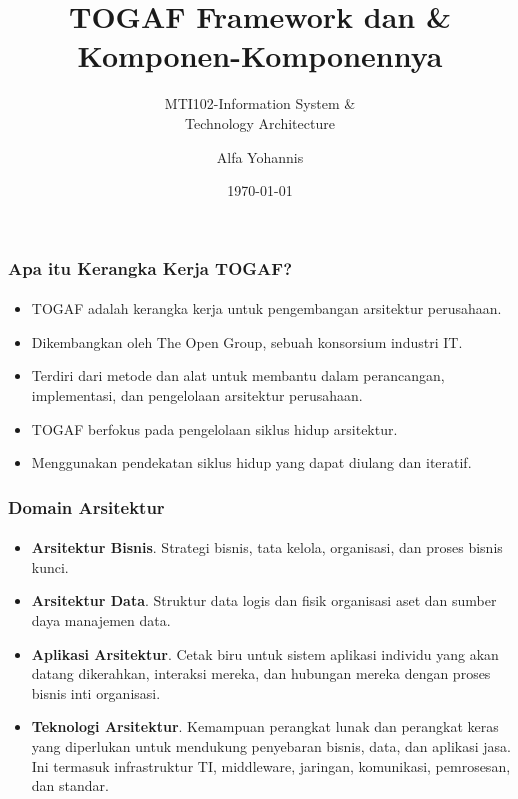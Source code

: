 \documentclass[aspectratio=169, table]{beamer}
\subtitle{MTI102-Information System \&\\Technology Architecture}
\title{TOGAF Framework dan \&\\ Komponen-Komponennya}
\author{Alfa Yohannis}
\date{\today}
\begin{document}
	
	\frame{\titlepage}
	
	\begin{frame}
		\frametitle{Apa itu Kerangka Kerja TOGAF?}
		\framesubtitle{\hspace{1cm}}
		\begin{itemize}
			\item TOGAF adalah kerangka kerja untuk pengembangan arsitektur perusahaan.
			\item Dikembangkan oleh The Open Group, sebuah konsorsium industri IT.
			\item Terdiri dari metode dan alat untuk membantu dalam perancangan, implementasi, dan pengelolaan arsitektur perusahaan.
			\item TOGAF berfokus pada pengelolaan siklus hidup arsitektur.
			\item Menggunakan pendekatan siklus hidup yang dapat diulang dan iteratif.
		\end{itemize}
	\end{frame}
	
	\begin{frame}
		\frametitle{Domain Arsitektur}
		\framesubtitle{\hspace{1cm}}
		\begin{itemize}
			\item \textbf{Arsitektur Bisnis}. Strategi bisnis, tata kelola, organisasi, dan proses bisnis kunci.
			
			\item \textbf{Arsitektur Data}. Struktur data logis dan fisik organisasi
			aset dan sumber daya manajemen data.
			
			\item \textbf{Aplikasi Arsitektur}. Cetak biru untuk sistem aplikasi individu yang akan datang dikerahkan, interaksi mereka, dan hubungan mereka dengan proses bisnis inti organisasi.
			
			\item \textbf{Teknologi Arsitektur}. Kemampuan perangkat lunak dan perangkat keras yang diperlukan untuk mendukung penyebaran bisnis, data, dan aplikasi jasa. Ini termasuk infrastruktur TI, middleware, jaringan, komunikasi, pemrosesan, dan standar.
		\end{itemize}
	\end{frame}
	
\end{document}
